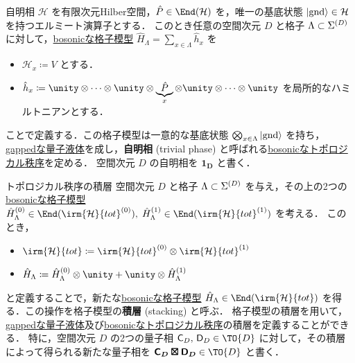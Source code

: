 \documentclass[TQFT_main]{subfiles}
\begin{document}
\begin{myexample}[label=def:trivialTO]{自明相}
    $\mathcal{H}$ を有限次元Hilber空間，$\hat{P} \in \End(\mathcal{H})$ を，唯一の基底状態 $\ket{\mathrm{gnd}} \in \mathcal{H}$ を持つエルミート演算子とする．
    このとき任意の空間次元 $D$ と格子 $\Lambda \subset \Sigma^{(D)}$ に対して，\hyperref[def:bosonic-lattice-model]{bosonicな格子模型} $\hat{H}_\Lambda = \sum_{x \in \Lambda} \hat{h}_x$ を
    \begin{itemize}
        \item $\mathcal{H}_x \coloneqq V$ とする．
        \item $\hat{h}_x \coloneqq \unity \otimes \cdots \otimes \unity \otimes \underbrace{\hat{P}}_{x} \otimes \unity \otimes \cdots \otimes \unity$ を局所的なハミルトニアンとする．
    \end{itemize}
    ことで定義する．この格子模型は一意的な基底状態 $\bigotimes_{x \in \Lambda} \ket{\mathrm{gnd}}$ を持ち，\hyperref[def:gappedQL]{gappedな量子液体}を成し，\textbf{自明相} (trivial phase) と呼ばれる\hyperref[def:quantum-phase]{bosonicなトポロジカル秩序}を定める．
    空間次元 $D$ の自明相を $\bm{1_D}$ と書く．
\end{myexample}

\begin{myexample}[label=def:stacking]{トポロジカル秩序の積層}
    空間次元 $D$ と格子 $\Lambda \subset \Sigma^{(D)}$ を与え，その上の2つの\hyperref[def:bosonic-lattice-model]{bosonicな格子模型} $\hat{H}^{(0)}_\Lambda \in \End (\irm{\mathcal{H}}{tot}^{(0)}),\; \hat{H}^{(1)}_\Lambda \in \End (\irm{\mathcal{H}}{tot}^{(1)})$ を考える．
    このとき，
    \begin{itemize}
        \item $\irm{\mathcal{H}}{tot} \coloneqq \irm{\mathcal{H}}{tot}^{(0)} \otimes \irm{\mathcal{H}}{tot}^{(1)}$
        \item $\hat{H}_\Lambda \coloneqq \hat{H}_\Lambda^{(0)} \otimes \unity + \unity \otimes \hat{H}_\Lambda^{(1)}$
    \end{itemize}
    と定義することで，新たな\hyperref[def:bosonic-lattice-model]{bosonicな格子模型} $\hat{H}_\Lambda \in \End (\irm{\mathcal{H}}{tot})$ を得る．この操作を格子模型の\textbf{積層} (stacking) と呼ぶ．
    格子模型の積層を用いて，\hyperref[def:gappedQL]{gappedな量子液体}及び\hyperref[def:quantum-phase]{bosonicなトポロジカル秩序}の積層を定義することができる．
    特に，空間次元 $D$ の2つの量子相 $\mathsf{C}_D,\, \mathsf{D}_D \in \TO{D}$ に対して，その積層によって得られる新たな量子相を $\bm{\mathsf{C}_D \boxtimes \mathsf{D}_D} \in \TO{D}$ と書く．
\end{myexample}
\end{document}
